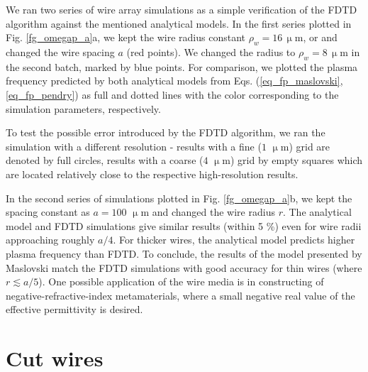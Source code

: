 We ran two series of wire array simulations as a simple verification of the FDTD algorithm against the mentioned analytical models. In the first series plotted in Fig. \ref{fg_omegap_a}a, we kept the wire radius constant $\rho_w = 16\,\upmu$m, or and changed the wire spacing $a$ (red points). We changed the radius to $\rho_w = 8\,\upmu$m in the second batch, marked by blue points. For comparison, we plotted the plasma frequency predicted by both analytical models from Eqs. (\ref{eq_fp_maslovski}, \ref{eq_fp_pendry}) as full and dotted lines with the color corresponding to the simulation parameters, respectively. 

To test the possible error introduced by the FDTD algorithm, we ran the simulation with a different resolution - results with a fine ($1$ $\upmu$m) grid are denoted by full circles, results with a coarse ($4$ $\upmu$m) grid by empty squares which are located relatively close to the respective high-resolution results.

In the second series of simulations plotted in Fig.  \ref{fg_omegap_a}b, we kept the spacing constant as $a = 100$ $\upmu$m and changed the wire radius $r$. The analytical model and FDTD simulations give similar results (within 5 \%) even for wire radii approaching roughly $a/4$. For thicker wires, the analytical model predicts higher plasma frequency than FDTD.  To conclude, the results of the model presented by Maslovski match the FDTD simulations with good accuracy for thin wires (where $r \lesssim a/5$). One possible application of the wire media is in constructing of negative-refractive-index metamaterials, where a small negative real value of the effective permittivity is desired.%


\FloatBarrier %
\section{Cut wires} \label{section_cutwires}%
